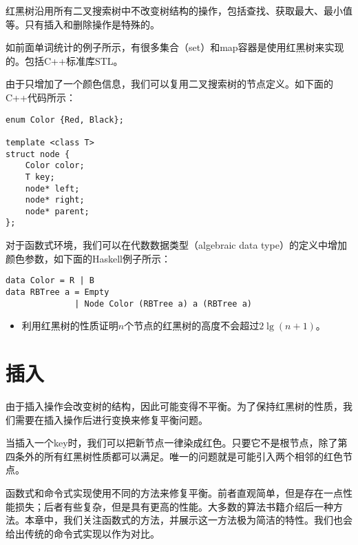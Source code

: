 \documentclass[UTF8]{article}
\begin{document}
红黑树沿用所有二叉搜索树中不改变树结构的操作，包括查找、获取最大、最小值等。只有插入和删除操作是特殊的。

如前面单词统计的例子所示，有很多集合（set）和map容器是使用红黑树来实现的。包括C++标准库STL\cite{sgi-stl}。

由于只增加了一个颜色信息，我们可以复用二叉搜索树的节点定义。如下面的C++代码所示：

\lstset{language=C++}
\begin{lstlisting}
enum Color {Red, Black};

template <class T>
struct node {
    Color color;
    T key;
    node* left;
    node* right;
    node* parent;
};
\end{lstlisting}

对于函数式环境，我们可以在代数数据类型（algebraic data type）的定义中增加颜色参数，如下面的Haskell例子所示：

\lstset{language=Haskell}
\begin{lstlisting}[style=Haskell]
data Color = R | B
data RBTree a = Empty
              | Node Color (RBTree a) a (RBTree a)
\end{lstlisting}

\begin{Exercise}

\begin{itemize}
\item 利用红黑树的性质证明$n$个节点的红黑树的高度不会超过$2 \lg (n+1)$。
\end{itemize}

\end{Exercise}

\section{插入}

由于插入操作会改变树的结构，因此可能变得不平衡。为了保持红黑树的性质，我们需要在插入操作后进行变换来修复平衡问题。

当插入一个key时，我们可以把新节点一律染成红色。只要它不是根节点，除了第四条外的所有红黑树性质都可以满足。唯一的问题就是可能引入两个相邻的红色节点。

函数式和命令式实现使用不同的方法来修复平衡。前者直观简单，但是存在一点性能损失；后者有些复杂，但是具有更高的性能。大多数的算法书籍介绍后一种方法。本章中，我们关注函数式的方法，并展示这一方法极为简洁的特性。我们也会给出传统的命令式实现以作为对比。
\end{document}
